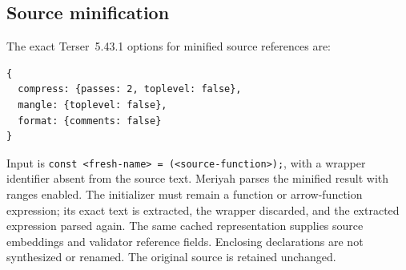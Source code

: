 \subsection{Source minification}
The exact Terser~5.43.1 options for minified source references are:
\begin{lstlisting}
{
  compress: {passes: 2, toplevel: false},
  mangle: {toplevel: false},
  format: {comments: false}
}
\end{lstlisting}
Input is \texttt{const <fresh-name> = (<source-function>);}, with a wrapper identifier absent from the source text. Meriyah parses the minified result with ranges enabled. The initializer must remain a function or arrow-function expression; its exact text is extracted, the wrapper discarded, and the extracted expression parsed again. The same cached representation supplies source embeddings and validator reference fields. Enclosing declarations are not synthesized or renamed. The original source is retained unchanged.

